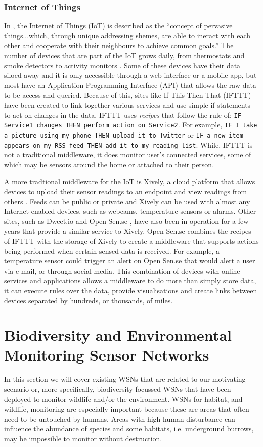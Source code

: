 	\subsubsection{Internet of Things}
		In \cite{giusto2010internet}, the Internet of Things (IoT) is described as the ``concept of pervasive things...which, through unique addressing shemes, are able to ineract with each other and cooperate with their neighbours to achieve common goals.'' The number of devices that are part of the IoT grows daily, from thermostats and smoke detectors \cite{nest} to activity monitors \cite{fitbit}. Some of these devices have their data siloed away and it is only accessible through a web interface or a mobile app, but most have an Application Programming Interface (API) that allows the raw data to be access and queried. Because of this, sites like If This Then That (IFTTT) \cite{ifttt} have been created to link together various services and use simple if statements to act on changes in the data. IFTTT uses \textit{recipes} that follow the rule of: \lstinline{IF Service1 changes THEN perform action on Service2}. For example, \lstinline{IF I take a picture using my phone THEN upload it to Twitter} or \lstinline{IF a new item appears on my RSS feed THEN add it to my reading list}. While, IFTTT is not a traditional middleware, it does monitor user's connected services, some of which may be sensors around the home or attached to their person.

		A more tradtional middleware for the IoT is Xively, a cloud platform that allows devices to upload their sensor readings to an endpoint and view readings from others \cite{xively}. Feeds can be public or private and Xively can be used with almost any Internet-enabled devices, such as webcams, temperature sensors or alarms. Other sites, such as Dweet.io \cite{dweet} and Open Sen.se \cite{opensense}, have also been in operation for a few years that provide a similar service to Xively. Open Sen.se combines the recipes of IFTTT with the storage of Xively to create a middleware that supports actions being performed when certain sensed data is received. For example, a temperature sensor could trigger an alert on Open Sen.se that would alert a user via e-mail, or through social media. This combination of devices with online services and applications allows a middleware to do more than simply store data, it can execute rules over the data, provide visualisations and create links between devices separated by hundreds, or thousands, of miles.


\section{Biodiversity and Environmental Monitoring Sensor Networks} \label{bg:bsn}
	In this section we will cover existing WSNs that are related to our motivating scenario or, more specifically, biodiversity focussed WSNs that have been deployed to monitor wildlife and/or the environment. WSNs for habitat, and wildlife, monitoring are especially important because these are areas that often need to be untouched by humans. Areas with high human disturbance can influence the abundance of species and some habitats, i.e. underground burrows, may be impossible to monitor without destruction. 
	
